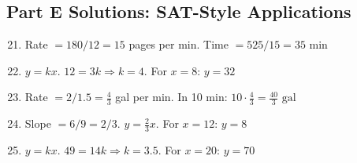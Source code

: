 \documentclass[14pt]{extarticle}
\begin{document}
\subsection*{Part E Solutions: SAT-Style Applications}
\begin{enumerate}
  \setcounter{enumi}{20}
  \item Rate \(=180/12=15\) pages per min. Time \(=525/15=\boxed{35\text{ min}}\)
  \item \(y=kx\). \(12=3k \Rightarrow k=4\). For \(x=8\): \(\boxed{y=32}\)
  \item Rate \(=2/1.5=\tfrac{4}{3}\) gal per min. In 10 min: \(10\cdot\tfrac{4}{3}=\boxed{\tfrac{40}{3}\text{ gal}}\)
  \item Slope \(=6/9=2/3\). \(\boxed{y=\tfrac{2}{3}x}\). For \(x=12\): \(\boxed{y=8}\)
  \item \(y=kx\). \(49=14k \Rightarrow k=3.5\). For \(x=20\): \(\boxed{y=70}\)
\end{enumerate}




\end{document}
